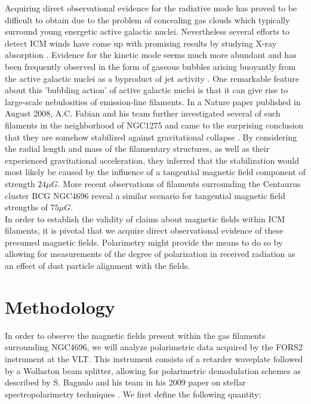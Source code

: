 \documentclass[twoside,single]{lion-msc}
\begin{document}
    \par Acquiring direct observational evidence for the radiative mode has proved to be difficult to obtain due to the problem of concealing gas clouds which typically surround young energetic active galactic nuclei. Nevertheless several efforts to detect ICM winds have come up with promising results by studying X-ray absorption \citep{Tombesi2011, Rupke2011}. Evidence for the kinetic mode seems much more abundant and has been frequently observed in the form of gaseous bubbles arising buoyantly from the active galactic nuclei as a byproduct of jet activity \citep{Churazov2000, Churazov2000a, McNamara2000}. One remarkable feature about this 'bubbling action' of active galactic nuclei is that it can give rise to large-scale nebulosities of emission-line filaments. In a Nature paper published in August 2008, A.C. Fabian and his team further investigated several of such filaments in the neighborhood of NGC1275 and came to the surprising conclusion that they are somehow stabilized against gravitational collapse \citep{Fabian2008}. By considering the radial length and mass of the filamentary structures, as well as their experienced gravitational acceleration, they inferred that the stabilization would most likely be caused by the influence of a tangential magnetic field component of strength $24 \mu G$. More recent observations of filaments surrounding the Centaurus cluster BCG NGC4696 reveal a similar scenario for tangential magnetic field strengths of $75 \mu G$. \\
    In order to establish the validity of claims about magnetic fields within ICM filaments, it is pivotal that we acquire direct observational evidence of these presumed magnetic fields. Polarimetry might provide the means to do so by allowing for measurements of the degree of polarization in received radiation as an effect of dust particle alignment with the fields.
    
    
    
    
\chapter{Methodology}    

    In order to observe the magnetic fields present within the gas filaments surrounding NGC4696, we will analyze polarimetric data acquired by the FORS2 instrument at the VLT. This instrument consists of a retarder waveplate followed by a Wollaston beam splitter, allowing for polarimetric demodulation schemes as described by S. Bagnulo and his team in his 2009 paper on stellar spectropolarimetry techniques \citep{Bagnulo2009}. We first define the following quantity:
    
\end{document}

